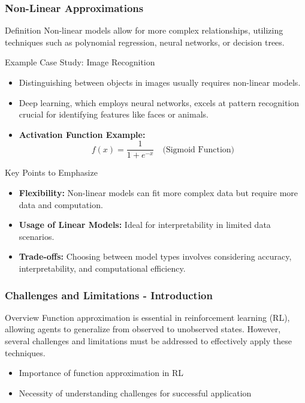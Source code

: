 \documentclass[aspectratio=169]{beamer}
\begin{document}
\begin{frame}[fragile]
    \frametitle{Non-Linear Approximations}
    \begin{block}{Definition}
        Non-linear models allow for more complex relationships, utilizing techniques such as polynomial regression, neural networks, or decision trees.
    \end{block}
    
    \begin{block}{Example Case Study: Image Recognition}
        \begin{itemize}
            \item Distinguishing between objects in images usually requires non-linear models. 
            \item Deep learning, which employs neural networks, excels at pattern recognition crucial for identifying features like faces or animals.
            \item \textbf{Activation Function Example:} 
            \begin{equation}
                f(x) = \frac{1}{1 + e^{-x}} \quad \text{(Sigmoid Function)}
            \end{equation}
        \end{itemize}
    \end{block}
    
    \begin{block}{Key Points to Emphasize}
        \begin{itemize}
            \item \textbf{Flexibility:} Non-linear models can fit more complex data but require more data and computation.
            \item \textbf{Usage of Linear Models:} Ideal for interpretability in limited data scenarios.
            \item \textbf{Trade-offs:} Choosing between model types involves considering accuracy, interpretability, and computational efficiency.
        \end{itemize}
    \end{block}
\end{frame}

\begin{frame}[fragile]
  \frametitle{Challenges and Limitations - Introduction}
  \begin{block}{Overview}
    Function approximation is essential in reinforcement learning (RL), allowing agents to generalize from observed to unobserved states. However, several challenges and limitations must be addressed to effectively apply these techniques.
  \end{block}

  \begin{itemize}
    \item Importance of function approximation in RL
    \item Necessity of understanding challenges for successful application
  \end{itemize}
\end{frame}
\end{document}
